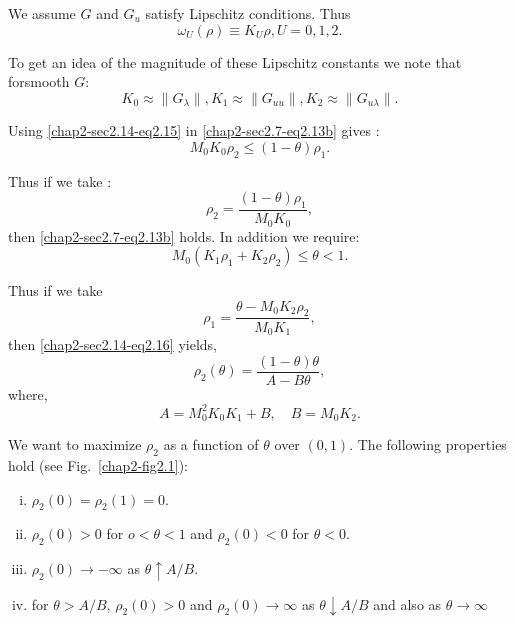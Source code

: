 We assume $G$ and $G_u$ satisfy Lipschitz conditions. Thus 
\begin{equation*}
\omega_U (\rho) \equiv K_U \rho, U=
0,1,2. \tag{2.15}\label{chap2-sec2.14-eq2.15}
\end{equation*}

To get an idea of the magnitude of these Lipschitz constants we note
that for\pageoriginale smooth $G$: 
$$
K_0 \approx \| G_\lambda \| , K_1 \approx \| G_{uu} \|, K_2 \approx \|
G_{u\lambda}\|. 
$$

Using \eqref{chap2-sec2.14-eq2.15} in \eqref{chap2-sec2.7-eq2.13b} gives :
$$
M_0K_0\rho_2 \le (1- \theta) \rho_1. 
$$

Thus if we take :
\begin{equation*}
\rho_2 = \frac{(1-\theta) \rho_1}{M_0 K_0},
\tag{2.16}\label{chap2-sec2.14-eq2.16}        
\end{equation*}
then \eqref{chap2-sec2.7-eq2.13b} holds. In addition we require: 
$$
M_0(K_1 \rho_1 + K_2 \rho_2) \le \theta < 1.
$$

Thus if we take
\begin{equation*}
\rho_1 = \frac{\theta - M_0 K_2 \rho_2}{M_0K_1},
\end{equation*}
then \eqref{chap2-sec2.14-eq2.16}  yields,
\begin{equation*}
\rho_2(\theta) = \frac{(1 -\theta) \theta }{A - B \theta},
\end{equation*}
where, 
$$
A = M^2_0 K_0 K_1 + B, \quad B= M_0K_2.
$$

We want to maximize $\rho_2$ as a function of $\theta$ over
$(0,1)$. The following properties hold (see Fig.~\ref{chap2-fig2.1}): 
\begin{enumerate}[(i)]
\item $\rho_2(0) = \rho_2(1) = 0$.

\item $\rho_2(0) > 0$ for $o < \theta < 1$ and $\rho_2(0) < 0$ for
  $\theta < 0$. 

\item $\rho_2(0)  \rightarrow - \infty$ as $\theta \uparrow A/B$. 

\item for $\theta > A/B$, $\rho_2(0) > 0$ and $\rho_2(0) \rightarrow
  \infty$ as $\theta \downarrow A/B$ and also as $\theta \rightarrow
  \infty$ 
\end{enumerate}

